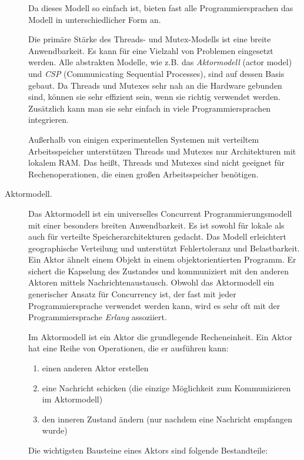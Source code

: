 \begin{description}
	Da dieses Modell so einfach ist, bieten fast alle Programmiersprachen das Modell in unterschiedlicher Form an.
	
	Die primäre Stärke des Threads- und Mutex-Modells ist eine breite Anwendbarkeit. Es kann für eine Vielzahl von Problemen eingesetzt werden. Alle abstrakten Modelle, wie z.B. das \textit{Aktormodell} (actor model) und \textit{CSP} (Communicating Sequential Processes), sind auf dessen Basis gebaut. Da Threads und Mutexes sehr nah an die Hardware gebunden sind, können sie sehr effizient sein, wenn sie richtig verwendet werden. Zusätzlich kann man sie sehr einfach in viele Programmiersprachen integrieren.
	
	Außerhalb von einigen experimentellen Systemen mit verteiltem Arbeitsspeicher unterstützen Threads und Mutexes nur Architekturen mit lokalem RAM. Das heißt, Threads und Mutexes sind nicht geeignet für Rechenoperationen, die einen großen Arbeitsspeicher benötigen.
	
	\item[Aktormodell.] Das Aktormodell ist ein universelles Concurrent Programmierungsmodell mit einer besonders breiten Anwendbarkeit. Es ist sowohl für lokale als auch für verteilte Speicherarchitekturen gedacht. Das Modell erleichtert geographische Verteilung und unterstützt Fehlertoleranz und Belastbarkeit.
	Ein Aktor ähnelt einem Objekt in einem objektorientierten Programm. Er sichert die Kapselung des Zustandes und kommuniziert mit den anderen Aktoren mittels Nachrichtenaustausch. Obwohl das Aktormodell ein generischer Ansatz für Concurrency ist, der fast mit jeder Programmiersprache verwendet werden kann, wird es sehr oft mit der Programmiersprache \textit{Erlang} assoziiert.
	
	Im Aktormodell ist ein Aktor die grundlegende Recheneinheit. Ein Aktor hat eine Reihe von Operationen, die er ausführen kann:
	
	\begin{enumerate}
		\item einen anderen Aktor erstellen
		
		\item eine Nachricht schicken (die einzige Möglichkeit zum Kommunizieren im Aktormodell)
		
		\item den inneren Zustand ändern (nur nachdem eine Nachricht empfangen wurde)
	\end{enumerate}

	Die wichtigsten Bausteine eines Aktors sind folgende Bestandteile:
	

\end{description}
